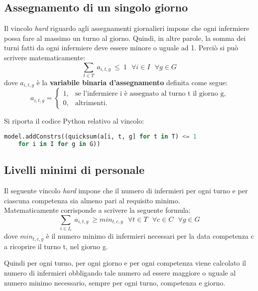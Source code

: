 \subsection{Assegnamento di un singolo giorno}
Il vincolo \textit{hard} riguardo agli assegnamenti giornalieri impone che ogni infermiere possa fare al massimo un turno al giorno. Quindi, in altre parole, la somma dei turni fatti da ogni infermiere deve essere minore o uguale ad 1. Perciò si può scrivere matematicamente:
\begin{equation}
\sum_{t \in T} ~ a_{i, t, g} ~ \leq ~ 1 ~~~ \forall i \in I ~~~ \forall g \in G
\end{equation}
dove $a_{i, t, g}$ è la \textbf{variabile binaria d'assegnamento} definita come segue:
\begin{equation}
\label{eq:varAssegnamento}
a_{i, t, g}=
\begin{cases}
1, & \text{se l'infermiere i è assegnato al turno t il giorno g,} \\
0, & \text{altrimenti.}
\end{cases}
\end{equation}

Si riporta il codice Python relativo al vincolo:
\begin{lstlisting}[language=Python]
model.addConstrs((quicksum(a[i, t, g] for t in T) <= 1 
	for i in I for g in G))
\end{lstlisting}


\subsection{Livelli minimi di personale}
Il seguente vincolo \textit{hard} impone che il numero di infermieri per ogni turno e per ciascuna competenza sia almeno pari al requisito minimo. \\
Matematicamente corrisponde a scrivere la seguente formula:
\begin{equation}
\sum_{i \in I_c} ~ a_{i,t,g} ~ \geq min_{t,c,g} ~~~ \forall t \in T ~~~ \forall c \in C ~~~ \forall g \in G
\end{equation}
dove $min_{t,c,g}$ è il numero minimo di infermieri necessari per la data competenza c a ricoprire il turno t, nel giorno g.

Quindi per ogni turno, per ogni giorno e per ogni competenza viene calcolato il numero di infermieri obbligando tale numero ad essere maggiore o uguale al numero minimo necessario, sempre per ogni turno, competenza e giorno.

